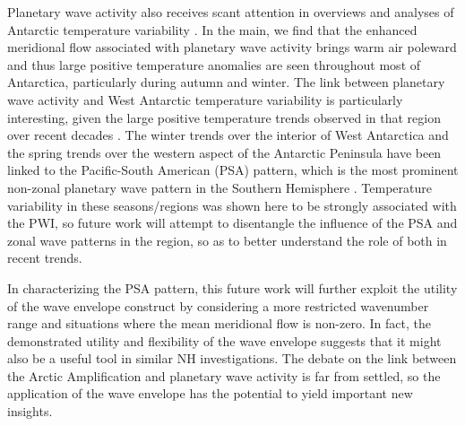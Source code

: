 Planetary wave activity also receives scant attention in overviews and analyses of Antarctic temperature variability \citep[e.g.][]{Russell2010,SchneiderOkumura2012,Yu2012}. In the main, we find that the enhanced meridional flow associated with planetary wave activity brings warm air poleward and thus large positive temperature anomalies are seen throughout most of Antarctica, particularly during autumn and winter. The link between planetary wave activity and West Antarctic temperature variability is particularly interesting, given the large positive temperature trends observed in that region over recent decades \citep[e.g.][]{Bromwich2013}. The winter trends over the interior of West Antarctica \citep{Ding2011} and the spring trends over the western aspect of the Antarctic Peninsula \citep{Ding2013} have been linked to the Pacific-South American (PSA) pattern, which is the most prominent non-zonal planetary wave pattern in the Southern Hemisphere \citep[e.g.][]{Mo2001}. Temperature variability in these seasons/regions was shown here to be strongly associated with the PWI, so future work will attempt to disentangle the influence of the PSA and zonal wave patterns in the region, so as to better understand the role of both in recent trends.    

In characterizing the PSA pattern, this future work will further exploit the utility of the wave envelope construct by considering a more restricted wavenumber range and situations where the mean meridional flow is non-zero. In fact, the demonstrated utility and flexibility of the wave envelope suggests that it might also be a useful tool in similar NH investigations. The debate on the link between the Arctic Amplification and planetary wave activity is far from settled, so the application of the wave envelope has the potential to yield important new insights.    

    
    
    
  